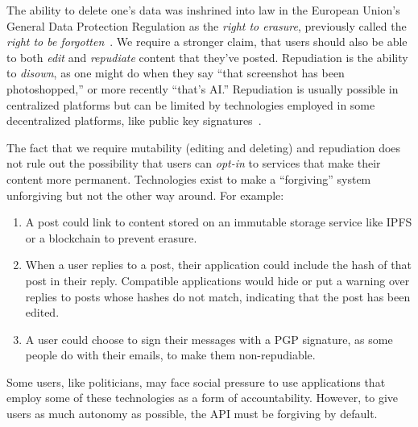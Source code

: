 The ability to delete one's data was inshrined into law in the European Union's
General Data Protection Regulation as
the \emph{right to erasure}, previously called the \emph{right to be forgotten}~\cite{gdpr}.
We require a stronger claim, that users should also be able to both \emph{edit}
and \emph{repudiate} content that they've posted. Repudiation is the ability to \emph{disown},
as one might do when they say ``that screenshot has been photoshopped,''
or more recently ``that's AI.'' Repudiation is usually possible in centralized platforms
but can be limited by technologies employed in some decentralized platforms,
like public key signatures~\cite{offtherecord}.

The fact that we require mutability (editing and deleting) and repudiation does not rule
out the possibility that users can \emph{opt-in} to services that make their content more permanent.
Technologies exist to make a ``forgiving'' system unforgiving but not the other way around.
For example:
\begin{enumerate}
\item
A post could link to content stored on an immutable storage service like IPFS
or a blockchain to prevent erasure.
\item
When a user replies to a post, their application could include the hash
of that post in their reply. Compatible applications would
hide or put a warning over replies to posts whose hashes do not match,
indicating that the post has been edited.
\item
A user could choose to sign their messages with a PGP signature,
as some people do with their emails, to make them non-repudiable.
\end{enumerate}
Some users, like politicians, may face social pressure to use applications
that employ some of these technologies as a form of accountability.
However, to give users as much autonomy as possible, the API must be forgiving by default.
